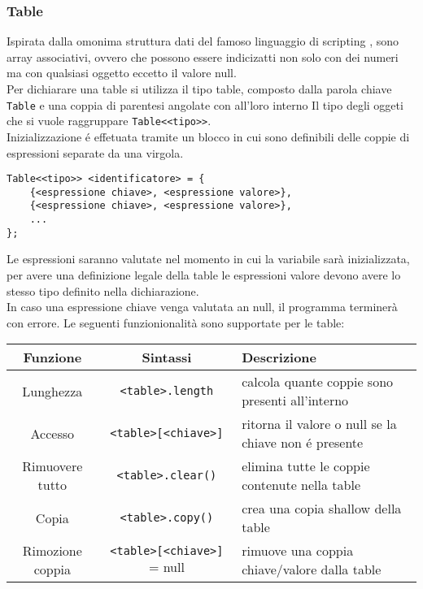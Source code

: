 \subsubsection{Table}
Ispirata dalla omonima struttura dati del famoso linguaggio di scripting \cite{LUA},
sono array associativi, ovvero che possono essere indicizatti non solo con dei 
numeri ma con qualsiasi oggetto eccetto il valore null. \\
Per dichiarare una table si utilizza il tipo table, composto dalla parola chiave
\lstinline|Table| e una coppia di parentesi angolate con all'loro interno Il tipo degli 
oggeti  che si vuole raggruppare \lstinline|Table<<tipo>>|. \\
Inizializzazione é effetuata tramite un blocco in cui sono definibili delle coppie
di espressioni separate da una virgola.
\begin{lstlisting}
Table<<tipo>> <identificatore> = {
    {<espressione chiave>, <espressione valore>},
    {<espressione chiave>, <espressione valore>},
    ...
};
\end{lstlisting}
Le espressioni saranno valutate nel momento in cui la variabile sarà inizializzata,
per avere una definizione legale della table le espressioni valore devono avere 
lo stesso tipo definito nella dichiarazione. \\
In caso una espressione chiave venga valutata an null, il programma terminerà con errore.
Le seguenti funzionionalità sono supportate per le table: \\
\begin{center}
\begin{tabular}{| c | c | p{5cm}|}
    \hline 
    Funzione & Sintassi & Descrizione \\
    \hline 
    Lunghezza & \lstinline|<table>.length| & calcola quante coppie sono presenti all'interno \\
    \hline
    Accesso & \lstinline|<table>[<chiave>]| & ritorna il valore o null se la chiave non é presente \\ 
    \hline
    Rimuovere tutto & \lstinline|<table>.clear()| & elimina tutte le coppie contenute nella table \\
    \hline
    Copia & \lstinline|<table>.copy()| & crea una copia shallow della table \\
    \hline
    Rimozione coppia & \lstinline|<table>[<chiave>]| = null & rimuove una coppia chiave/valore dalla table \\
    \hline
\end{tabular}
\end{center}

